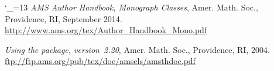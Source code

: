 \renewcommand{\bibname}{Bibliography}
\begin{thebibliography}{HANDBK}

\catcode`\_=13
 \textit{AMS Author Handbook, Monograph Classes},
  Amer. Math. Soc., Providence, RI, September 2014.
  \url{http://www.ams.org/tex/Author_Handbook_Mono.pdf}

 \textit{Using the  package,
  version~\textup{2.20}}, Amer. Math. Soc., Providence, RI, 2004.
  \url{ftp://ftp.ams.org/pub/tex/doc/amscls/amsthdoc.pdf}

\end{thebibliography}